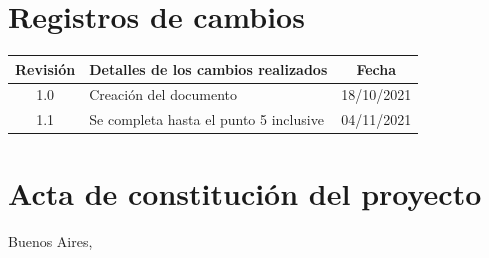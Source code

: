 \documentclass[
11pt, %
]{charter}
\begin{document}
\maketitle
\thispagestyle{empty}
\pagebreak


\thispagestyle{empty}
{\setlength{\parskip}{0pt}
\tableofcontents{}
}
\pagebreak


\section*{Registros de cambios}
\label{sec:registro}


\begin{table}[ht]
\label{tab:registro}
\centering
\begin{tabularx}{\linewidth}{@{}|c|X|c|@{}}
\hline
\rowcolor[HTML]{C0C0C0} 
Revisión & \multicolumn{1}{c|}{\cellcolor[HTML]{C0C0C0}Detalles de los cambios realizados} & Fecha      \\ \hline
1.0      & Creación del documento                                 & 18/10/2021 \\ \hline
1.1      & Se completa hasta el punto 5 inclusive                 & 04/11/2021 \\ \hline
\end{tabularx}
\end{table}

\pagebreak



\section*{Acta de constitución del proyecto}
\label{sec:acta}

\begin{flushright}
Buenos Aires, \fechaInicioName
\end{flushright}

\vspace{2cm}
\end{document}
